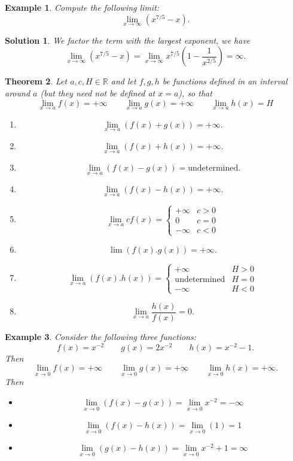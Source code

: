 \documentclass[12pt,a4paper]{book}
\newtheorem{theorem}{Theorem}[section]
\newtheorem{Example}[theorem]{Example}
\numberwithin{equation}{section}
\newtheorem*{solution}{{\bf Solution}}
\begin{document}
\begin{Example}
	Compute the following limit:
	$$\lim_{x\to \infty} \left( x^{7/5}-x\right).$$
\end{Example}

\begin{solution}
	We factor the term with the largest exponent, we have
		$$\lim_{x\to \infty} \left( x^{7/5}-x\right)=\lim_{x\to \infty} x^{7/5}\left( 1-\frac{1}{x^{2/5}}\right)=\infty.$$
\end{solution}

\begin{theorem}
	Let $a,c,H\in \mathbb{R}$ and let $f,g,h$ be functions defined in an interval around $a$ (but they need not be defined at $x=a$), so that 
	$$ \lim_{x\to a}f(x)=+\infty \quad \quad \lim_{x\to a}g(x)=+\infty \quad \quad \lim_{x\to a}h(x)=H$$
	\begin{enumerate}
		\item $$\lim_{x\to a}(f(x)+g(x))=+\infty.$$
			\item $$\lim_{x\to a}(f(x)+h(x))=+\infty.$$
				\item $$\lim_{x\to a}(f(x)-g(x))=\text{undetermined}.$$
					\item $$\lim_{x\to a}(f(x)-h(x))=+\infty.$$
					\item $$\lim_{x\to a}cf(x)=\begin{cases}
					+\infty & c>0\\
					0 & c=0\\
					-\infty & c<0
					\end{cases}$$
					\item $$\lim(f(x).g(x))=+\infty.$$
					\item $$\lim_{x\to a} (f(x).h(x))
					=\begin{cases}
					+\infty & H>0\\
					\text{undetermined} & H=0\\
					-\infty & H<0
					\end{cases}$$
					\item $$\lim_{x\to a} \frac{h(x)}{f(x)}=0.$$
	\end{enumerate}
\end{theorem}

\begin{tcolorbox}[width=\textwidth,colback={green!20},title={},colbacktitle=yellow,coltitle=blue]
\begin{Example}
	Consider the following three functions:
	$$f(x)=x^{-2}\quad \quad g(x)=2x^{-2}\quad \quad h(x)=x^{-2}-1.$$
	Then 
	$$\lim_{x\to 0}f(x)=+\infty \quad \quad \lim_{x\to 0}g(x)=+\infty \quad \quad \lim_{x\to 0}h(x)=+\infty.$$
	Then 
   \begin{itemize}
   	\item $$ \lim_{x\to 0} (f(x)-g(x))=\lim_{x\to 0}x^{-2}=-\infty$$
   	\item $$ \lim_{x\to 0} (f(x)-h(x))=\lim_{x\to 0}(1)=1$$
   	\item $$ \lim_{x\to 0} (g(x)-h(x))=\lim_{x\to 0}x^{-2}+1=\infty$$
   \end{itemize}
\end{Example}
\end{tcolorbox}
\end{document}
